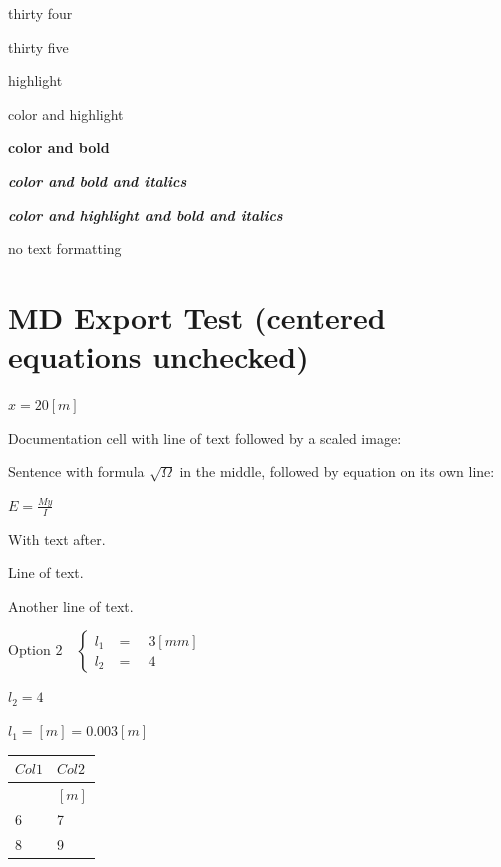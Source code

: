 \documentclass[
  letterpaper,
]{article}
\newcounter{none} %
\begin{document}
{\textcolor[HTML]{002966}{thirty four}}

{\textcolor[HTML]{3D1466}{thirty five}}

{\colorbox[HTML]{FFFF00}{highlight}}

{\textcolor[HTML]{E60000}{\colorbox[HTML]{FFFF00}{color and highlight}}}

\textbf{{\textcolor[HTML]{0066CC}{color and bold}}}

\emph{\textbf{{\textcolor[HTML]{0066CC}{color and bold and italics}}}}

\emph{\textbf{{\textcolor[HTML]{0066CC}{\colorbox[HTML]{FFFFCC}{color
and highlight and bold and italics}}}}}

no text formatting

\section{MD Export Test (centered equations
unchecked)}\label{md-export-test-centered-equations-unchecked}

\(x=20\left\lbrack m\right\rbrack\)

Documentation cell with line of text followed by a scaled image:

Sentence with formula \(\sqrt{\Omega}\) in the middle, followed by
equation on its own line:

\(E=\frac{My}{I}\)

With text after.

Line of text.

Another line of text.

\(\text{Option 2} \quad  \begin{cases} l_1 & = \quad 3 \left\lbrack mm\right\rbrack \\ l_2 & = \quad 4  \end{cases}\)

\(l_2= 4\)

\(l_1=\left\lbrack m\right\rbrack =0.003 \left\lbrack m\right\rbrack\)

{\def\LTcaptype{none} %
\begin{longtable}[]{@{}ll@{}}
\toprule\noalign{}
\(Col1\) & \(Col2\) \\
\midrule\noalign{}
\endhead
\bottomrule\noalign{}
\endlastfoot
& \(\left\lbrack m\right\rbrack\) \\
6 & 7 \\
8 & 9 \\
\end{longtable}
}
\end{document}
